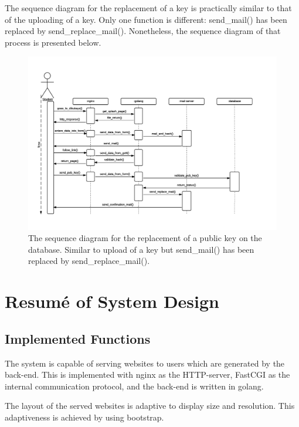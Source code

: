 \documentclass[11pt,a4paper]{report}
\begin{document}
The sequence diagram for the replacement of a key is practically similar to that of the uploading of a key. Only one function is different: send\_mail() has been replaced by send\_replace\_mail(). Nonetheless, the sequence diagram of that process is presented below.


\begin{figure}[H]
    \centering
    \includegraphics[width=\textwidth]{pictures/sequence_diagram_replace_key}
     \caption{The sequence diagram for the replacement of a public key on the database. Similar to upload of a key but send\_mail() has been replaced by send\_replace\_mail().}
    \label{fig:use_case_diagram_example_two}
\end{figure}

\section{Resumé of System Design}\label{sec:Systemdesign}
\subsection{Implemented Functions}
The system is capable of serving websites to users which are generated by the back-end. This is implemented with nginx as the HTTP-server, FastCGI as the internal communication protocol, and the back-end is written in golang.

The layout of the served websites is adaptive to display size and resolution. This adaptiveness is achieved by using bootstrap. \\
\end{document}
